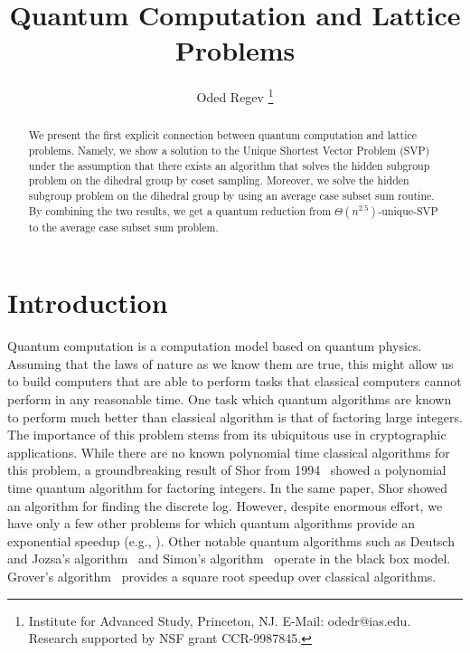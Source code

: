 \documentclass[11pt]{article}
\newcommand\alternate[2]{{#1}}
\begin{document}
\title{\bf Quantum Computation and Lattice Problems }

\author{
Oded Regev
\thanks{Institute for Advanced Study, Princeton, NJ.
E-Mail: odedr@ias.edu. Research supported by NSF grant CCR-9987845.} }

\alternate{}{\date{}}
\maketitle

\begin{abstract}
We present the first explicit connection between quantum computation and lattice problems. Namely, we show a solution
to the Unique Shortest Vector Problem (SVP) under the assumption that there exists an algorithm that solves the hidden
subgroup problem on the dihedral group by coset sampling. Moreover, we solve the hidden subgroup problem on the
dihedral group by using an average case subset sum routine. By combining the two results, we get a quantum reduction
from $\Theta(n^{2.5})$-unique-SVP to the average case subset sum problem.
\end{abstract}

\section{Introduction}

Quantum computation is a computation model based on quantum physics. Assuming that the laws of nature as we know them
are true, this might allow us to build computers that are able to perform tasks that classical computers cannot perform
in any reasonable time. One task which quantum algorithms are known to perform much better than classical algorithm is
that of factoring large integers. The importance of this problem stems from its ubiquitous use in cryptographic
applications. While there are no known polynomial time classical algorithms for this problem, a groundbreaking result
of Shor from 1994~\cite{ShorFactor} showed a polynomial time quantum algorithm for factoring integers. In the same
paper, Shor showed an algorithm for finding the discrete log. However, despite enormous effort, we have only a few
other problems for which quantum algorithms provide an exponential speedup (e.g., \cite{HallgrenPell,HallgrenHCP}).
Other notable quantum algorithms such as Deutsch and Jozsa's algorithm~\cite{DeutschJozsa} and Simon's
algorithm~\cite{Simon} operate in the black box model. Grover's algorithm~\cite{Grover} provides a square root speedup
over classical algorithms.
\end{document}
